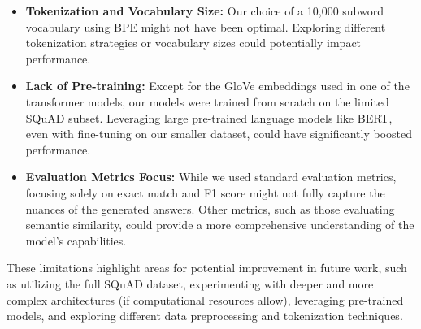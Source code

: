 \documentclass[runningheads]{llncs}
\begin{document}
\begin{itemize}
    \item \textbf{Tokenization and Vocabulary Size:} Our choice of a 10,000 subword vocabulary using BPE might not have been optimal. Exploring different tokenization strategies or vocabulary sizes could potentially impact performance.
    
    \item \textbf{Lack of Pre-training:} Except for the GloVe embeddings used in one of the transformer models, our models were trained from scratch on the limited SQuAD subset. Leveraging large pre-trained language models like BERT, even with fine-tuning on our smaller dataset, could have significantly boosted performance.
    
    \item \textbf{Evaluation Metrics Focus:} While we used standard evaluation metrics, focusing solely on exact match and F1 score might not fully capture the nuances of the generated answers. Other metrics, such as those evaluating semantic similarity, could provide a more comprehensive understanding of the model's capabilities.
\end{itemize}

These limitations highlight areas for potential improvement in future work, such as utilizing the full SQuAD dataset, experimenting with deeper and more complex architectures (if computational resources allow), leveraging pre-trained models, and exploring different data preprocessing and tokenization techniques.



	
	
	
	
\end{document}
